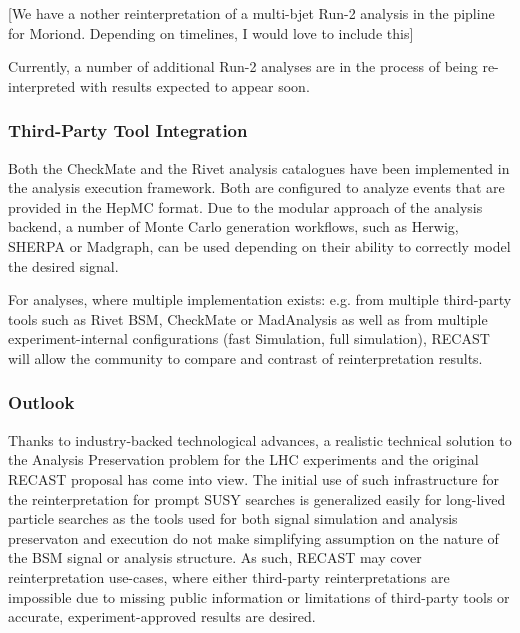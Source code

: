 [We have a nother reinterpretation of a multi-bjet Run-2 analysis in the pipline for Moriond. Depending on timelines, I would love to include this]

Currently, a number of additional Run-2 analyses are in the process of being re-interpreted with results expected to appear soon.

\subsubsection{Third-Party Tool Integration}

Both the CheckMate and the Rivet analysis catalogues have been implemented in the analysis execution framework. Both are configured to analyze events that are provided in the HepMC format. Due to the modular approach of the analysis backend, a number of Monte Carlo generation workflows, such as Herwig, SHERPA or Madgraph, can be used depending on their ability to correctly model the desired signal.

For analyses, where multiple implementation exists: e.g. from multiple third-party tools such as Rivet BSM, CheckMate or MadAnalysis as well as from multiple experiment-internal configurations (fast Simulation, full simulation), RECAST will allow the community to compare and contrast of reinterpretation results.

\subsubsection{Outlook}

Thanks to industry-backed technological advances, a realistic technical solution to the Analysis Preservation problem for the LHC experiments and the original RECAST proposal has come into view. The initial use of such infrastructure for the reinterpretation for prompt SUSY searches is generalized easily for long-lived particle searches as the tools used for both signal simulation and analysis preservaton and execution do not make simplifying assumption on the nature of the BSM signal or analysis structure.  As such, RECAST may cover reinterpretation use-cases, where either third-party reinterpretations are impossible due to missing public information or limitations of third-party tools or accurate, experiment-approved results are desired.
